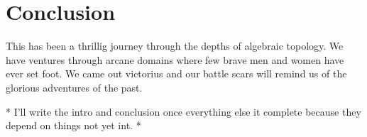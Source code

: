 \chapter{Conclusion}
\label{chapter5}

This has been a thrillig journey through the depths of algebraic topology. We have ventures through arcane domains where few brave men and women have ever set foot. We came out victorius and our battle scars will remind us of the glorious adventures of the past.

* I'll write the intro and conclusion once everything else it complete because they depend on things not yet int. *
